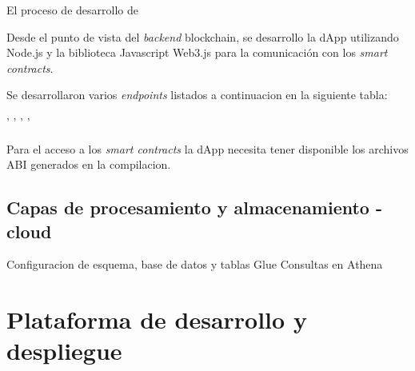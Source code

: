 El proceso de desarrollo de 


Desde el punto de vista del \textit{backend} blockchain, se desarrollo la dApp utilizando Node.js y la biblioteca Javascript Web3.js para la comunicación con los \textit{smart contracts}.

Se desarrollaron varios \textit{endpoints} listados a continuacion en la siguiente tabla:

'
'
'
'

Para el acceso a los \textit{smart contracts} la dApp necesita tener disponible los archivos ABI generados en la compilacion.

\subsection{Capas de procesamiento y almacenamiento - cloud}

Configuracion de esquema, base de datos y tablas Glue
Consultas en Athena


\section{Plataforma de desarrollo y despliegue}




